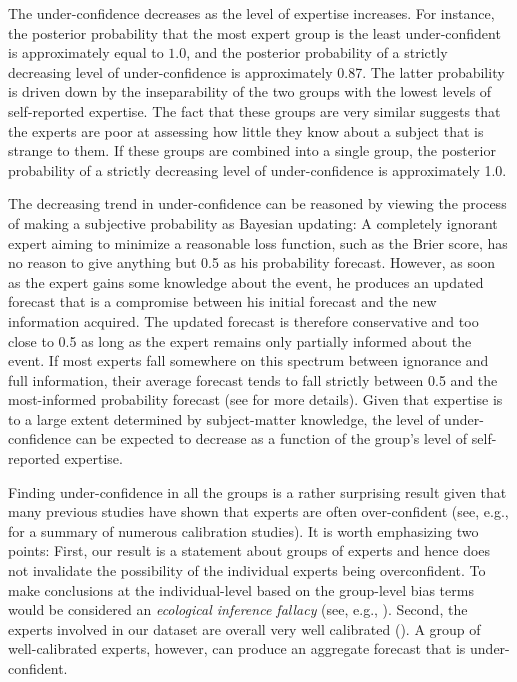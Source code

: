 \documentclass[aoas, preprint]{imsart}
\numberwithin{equation}{section}
\theoremstyle{plain}
\begin{document}
The under-confidence decreases as the level of  expertise increases.  For instance, the posterior probability that the most expert group is the least under-confident is approximately equal to $1.0$, and the posterior probability of a strictly decreasing level of under-confidence is approximately 0.87. The latter probability is driven down by the inseparability of the two groups with the lowest levels of self-reported expertise. The fact that these groups are very similar suggests that the experts are poor at assessing how little they know about a subject that is strange to them. If these groups are combined into a single group, the posterior probability of a strictly decreasing level of under-confidence is approximately 1.0. 

The decreasing trend in under-confidence can be reasoned by viewing the process of making a subjective probability  as Bayesian updating: A completely ignorant expert aiming to minimize a reasonable loss function, such as the Brier score, has no reason to give anything but 0.5 as his probability forecast. However, as soon as the expert gains some knowledge about the event, he produces an updated forecast that is a compromise between his initial forecast and the new information acquired. The updated forecast is therefore conservative and too close to 0.5 as long as the expert remains only partially informed about the event. If most experts fall somewhere on this spectrum between ignorance and full information, their average forecast tends to fall strictly between 0.5 and the most-informed probability forecast (see \citet{Baron} for more details). Given that expertise is to a large extent determined by subject-matter knowledge, the level of under-confidence can be expected to decrease as a function of the group's level of self-reported expertise.

Finding under-confidence in all the groups is a rather surprising result given that many previous studies have shown that experts are often over-confident (see, e.g., \citet{lichtenstein1977calibration, morgan1992uncertainty, bier2004implications} for a summary of numerous calibration studies). It is worth emphasizing two points: First, our result is a statement about groups of experts and hence does not invalidate the possibility of the individual experts being overconfident. To make conclusions at the individual-level based on the group-level bias terms would be considered an \textit{ecological inference fallacy} (see, e.g., \citet{lubinski1996seeing}). Second, the experts involved in our dataset are overall very well calibrated (\cite{mellers}). A group of well-calibrated experts, however, can produce an aggregate forecast that is under-confident.
\end{document}
